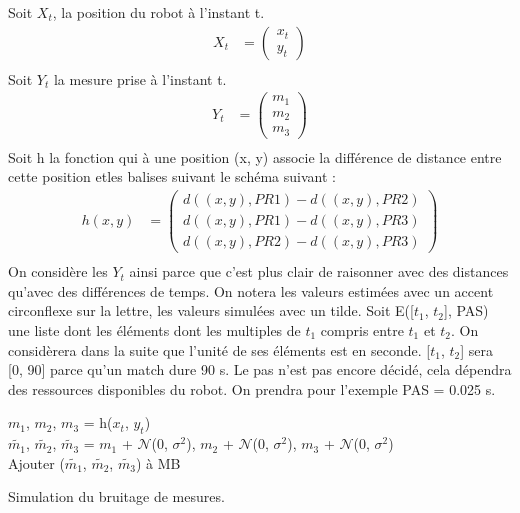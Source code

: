 \documentclass[a4paper, 8pt]{article}
\begin{document}
Soit $X_t$, la position du robot à l'instant t.
\begin{equation}
	\begin{split}\label{3}
		X_t  &= \begin{pmatrix}
			x_t  \\
			y_t 
		\end{pmatrix}\\
	\end{split}
\end{equation}
Soit $Y_t$ la mesure prise à l'instant t.
\begin{equation} \label{4}
	\begin{split}
	Y_t &= \begin{pmatrix}
			m_1  \\
			m_2  \\
			m_3
		\end{pmatrix}\\
	\end{split}
\end{equation}
Soit h la fonction qui à une position (x, y) associe la différence de distance entre cette position etles balises suivant le schéma suivant : 
\begin{equation}
	\begin{split}\label{5}
		h(x, y)  &= 
		\begin{pmatrix}
				d((x,y),PR1) - d((x,y),PR2)\\
				d((x,y),PR1) - d((x,y),PR3)\\
				d((x,y),PR2) - d((x,y),PR3)
		\end{pmatrix}\\
	\end{split}
\end{equation}
On considère les $Y_t$ ainsi parce que c'est plus clair de raisonner avec des distances qu'avec des différences de temps. On notera les valeurs estimées avec un accent circonflexe sur la lettre, les valeurs simulées avec un tilde.
Soit E([$t_1$, $t_2$], PAS) une liste dont les éléments dont les multiples de $t_1$ compris entre $t_1$ et $t_2$. On considèrera dans la suite que l'unité de ses éléments est en seconde. 
[$t_1$, $t_2$] sera [0, 90] parce qu'un match dure 90 s. Le pas n'est pas encore décidé, cela dépendra des ressources disponibles du robot. On prendra pour l'exemple PAS = 0.025 s.

\begin{algorithm}[H]
		
		{$m_1$, $m_2$, $m_3$ = h($x_t$, $y_t$) \\
		$\tilde{m_1}$, $\tilde{m_2}$, $\tilde{m_3}$ = {$m_1$} + $\mathcal{N}$(0, $\sigma^2$), {$m_2$} + $\mathcal{N}$(0, $\sigma^2$), {$m_3$} + $\mathcal{N}$(0, $\sigma^2$)\\
		Ajouter ($\tilde{m_1}$, $\tilde{m_2}$, $\tilde{m_3}$) à MB
		}
		
	\caption{Simulation du bruitage de mesures.}
	\end{algorithm}
\end{document}
